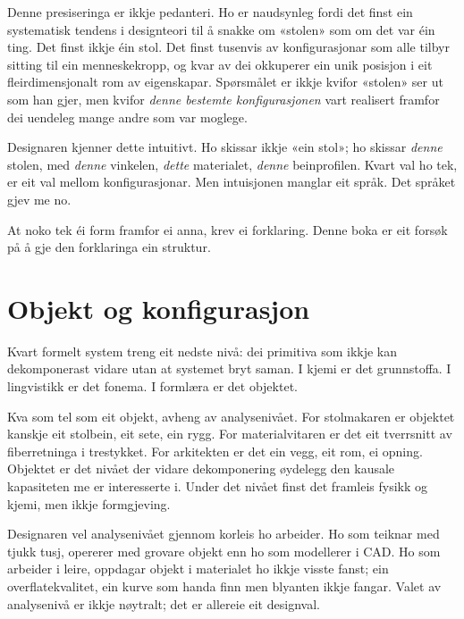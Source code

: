 Denne presiseringa er ikkje pedanteri. Ho er naudsynleg fordi det finst ein systematisk tendens i designteori til å snakke om «stolen» som om det var éin ting. Det finst ikkje éin stol. Det finst tusenvis av konfigurasjonar som alle tilbyr sitting til ein menneskekropp, og kvar av dei okkuperer ein unik posisjon i eit fleirdimensjonalt rom av eigenskapar. Spørsmålet er ikkje kvifor «stolen» ser ut som han gjer, men kvifor \textit{denne bestemte konfigurasjonen} vart realisert framfor dei uendeleg mange andre som var moglege.

Designaren kjenner dette intuitivt. Ho skissar ikkje «ein stol»; ho skissar \textit{denne} stolen, med \textit{denne} vinkelen, \textit{dette} materialet, \textit{denne} beinprofilen. Kvart val ho tek, er eit val mellom konfigurasjonar. Men intuisjonen manglar eit språk. Det språket gjev me no.

At noko tek éi form framfor ei anna, krev ei forklaring. Denne boka er eit forsøk på å gje den forklaringa ein struktur.

\section*{Objekt og konfigurasjon}



Kvart formelt system treng eit nedste nivå: dei primitiva som ikkje kan dekomponerast vidare utan at systemet bryt saman. I kjemi er det grunnstoffa. I lingvistikk er det fonema. I formlæra er det objektet.

Kva som tel som eit objekt, avheng av analysenivået. For stolmakaren er objektet kanskje eit stolbein, eit sete, ein rygg. For materialvitaren er det eit tverrsnitt av fiberretninga i trestykket. For arkitekten er det ein vegg, eit rom, ei opning. Objektet er det nivået der vidare dekomponering øydelegg den kausale kapasiteten me er interesserte i. Under det nivået finst det framleis fysikk og kjemi, men ikkje formgjeving.

Designaren vel analysenivået gjennom korleis ho arbeider. Ho som teiknar med tjukk tusj, opererer med grovare objekt enn ho som modellerer i CAD. Ho som arbeider i leire, oppdagar objekt i materialet ho ikkje visste fanst; ein overflatekvalitet, ein kurve som handa finn men blyanten ikkje fangar. Valet av analysenivå er ikkje nøytralt; det er allereie eit designval.

